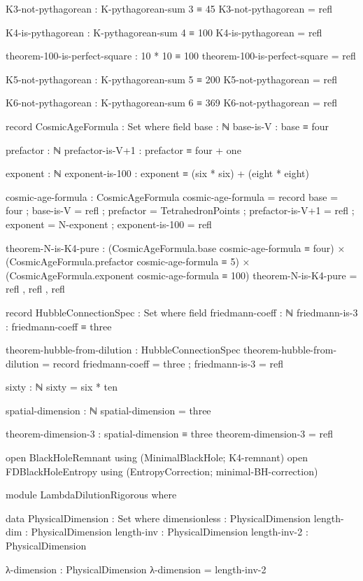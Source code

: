 \documentclass[11pt,a4paper]{book}
\begin{document}
\begin{code}
K3-not-pythagorean : K-pythagorean-sum 3 ≡ 45
K3-not-pythagorean = refl

K4-is-pythagorean : K-pythagorean-sum 4 ≡ 100
K4-is-pythagorean = refl

theorem-100-is-perfect-square : 10 * 10 ≡ 100
theorem-100-is-perfect-square = refl

K5-not-pythagorean : K-pythagorean-sum 5 ≡ 200
K5-not-pythagorean = refl

K6-not-pythagorean : K-pythagorean-sum 6 ≡ 369
K6-not-pythagorean = refl

record CosmicAgeFormula : Set where
  field
    base : ℕ
    base-is-V : base ≡ four
    
    prefactor : ℕ
    prefactor-is-V+1 : prefactor ≡ four + one
    
    exponent : ℕ
    exponent-is-100 : exponent ≡ (six * six) + (eight * eight)

cosmic-age-formula : CosmicAgeFormula
cosmic-age-formula = record
  { base = four
  ; base-is-V = refl
  ; prefactor = TetrahedronPoints
  ; prefactor-is-V+1 = refl
  ; exponent = N-exponent
  ; exponent-is-100 = refl
  }

theorem-N-is-K4-pure : 
  (CosmicAgeFormula.base cosmic-age-formula ≡ four) × 
  (CosmicAgeFormula.prefactor cosmic-age-formula ≡ 5) × 
  (CosmicAgeFormula.exponent cosmic-age-formula ≡ 100)
theorem-N-is-K4-pure = refl , refl , refl

record HubbleConnectionSpec : Set where
  field
    friedmann-coeff : ℕ
    friedmann-is-3 : friedmann-coeff ≡ three

theorem-hubble-from-dilution : HubbleConnectionSpec
theorem-hubble-from-dilution = record
  { friedmann-coeff = three
  ; friedmann-is-3 = refl
  }

sixty : ℕ
sixty = six * ten

spatial-dimension : ℕ
spatial-dimension = three

theorem-dimension-3 : spatial-dimension ≡ three
theorem-dimension-3 = refl

open BlackHoleRemnant using (MinimalBlackHole; K4-remnant)
open FDBlackHoleEntropy using (EntropyCorrection; minimal-BH-correction)

module LambdaDilutionRigorous where

  data PhysicalDimension : Set where
    dimensionless : PhysicalDimension
    length-dim    : PhysicalDimension
    length-inv    : PhysicalDimension
    length-inv-2  : PhysicalDimension
    
  λ-dimension : PhysicalDimension
  λ-dimension = length-inv-2
  

\end{code}
\end{document}

